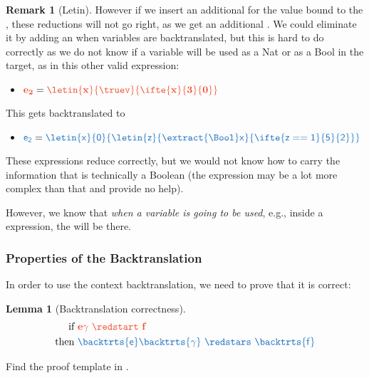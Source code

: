 \documentclass{article}
\newtheorem{lemma}[theorem]{Lemma}
\theoremstyle{definition}
\newtheorem{remark}[theorem]{Remark}
\begin{document}
\begin{remark}[Letin]
	However if we insert an additional \src{\extract{\Nat}} for the value bound to the , these reductions will not go right, as we get an additional .
	We could eliminate it by adding an \src{\inject{\Nat}} when variables are backtranslated, but this is hard to do correctly as we do not know if a variable will be used as a Nat or as a Bool in the target, as in this other valid expression:
	\begin{itemize}
		\item $\trg{e_2}=\trg{\letin{x}{\truev}{\ifte{x}{3}{0}}}$
	\end{itemize}
	This gets backtranslated to 
	\begin{itemize}
		\item $\src{e_2}=\src{\letin{x}{0}{\letin{z}{\extract{\Bool}x}{\ifte{z==1}{5}{2}}}}$
	\end{itemize}
	These expressions reduce correctly, but we would not know how to carry the information that  is technically a Boolean (the \trg{\truev} expression may be a lot more complex than that and provide no help).

	However, we know that \emph{when a variable is going to be used}, e.g., inside a \src{\oplus} expression, the \src{\extract{\cdot}} will be there.

\end{remark}

\subsubsection{Properties of the Backtranslation}
In order to use the context backtranslation, we need to prove that it is correct:
\begin{lemma}[Backtranslation correctness]\label{thm:backtr-corr}
\begin{align*}
	\text{if }
	&
	\trg{e\gamma\ \redstart\ f}
	\\
	\text{then }
	&
	\src{\backtrts{e}\backtrts{\gamma}\ \redstars\ \backtrts{f}}
\end{align*}	
\end{lemma}
Find the proof template in .
\end{document}
